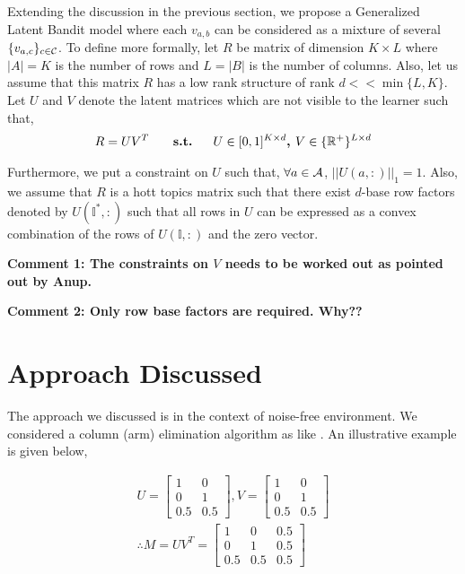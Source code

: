 \documentclass[twoside]{article}
\begin{document}
	Extending the discussion in the previous section, we propose a Generalized Latent Bandit model where each $v_{a,b}$ can be considered as a mixture of several $\lbrace v_{a,c}\rbrace_{c\in\mathcal{C}}$. To define more formally, let $R$ be matrix of  dimension $K\times L$ where $|A|=K$ is the number of rows and $L=|B|$ is the number of columns. Also, let us assume that this matrix  $R$ has a low rank structure of rank $d << \min\lbrace L,K\rbrace$. Let $U$ and $V$ denote the latent matrices which are not visible to the learner such that,
\begin{align*}
	R = UV^{T} \textbf{ \hspace*{4mm}   s.t.   \hspace*{4mm}} U\in [ 0,1 ]^{K\times d} \textbf{, } V\in \lbrace\mathbb{R}^+\rbrace^{L\times d} 
\end{align*}	  
	
	Furthermore, we put a constraint on $U$ such that, $\forall a\in \mathcal{A}$, $ ||U(a,:)||_1 = 1$. Also, we assume that $R$ is a hott topics matrix such that there exist $d$-base row factors denoted by $U(\mathbb{I}^*,:)$ such that all rows in $U$ can be expressed as a convex combination of the rows of $U(\mathbb{I},:)$ and the zero vector. 
	
	\textbf{Comment 1: The constraints on $V$ needs to be worked out as pointed out by Anup.}
	
	\textbf{Comment 2: Only row base factors are required. Why??}
	
	
\section{Approach Discussed}

The approach we discussed is in the context of noise-free environment. We considered a column (arm) elimination algorithm as like \citet{auer2010ucb}. An illustrative example is given below, 

\begin{align*}
U = \begin{bmatrix}
    1 & 0 \\
    0 & 1 \\
    0.5 & 0.5
\end{bmatrix} , V= \begin{bmatrix}
    1 & 0 \\
    0 & 1 \\
    0.5 & 0.5
\end{bmatrix} \\
\therefore M = UV^{T} = \begin{bmatrix}
    1 & 0 & 0.5\\
    0 & 1 & 0.5\\
    0.5 & 0.5 & 0.5
\end{bmatrix} 
\end{align*}
\end{document}
